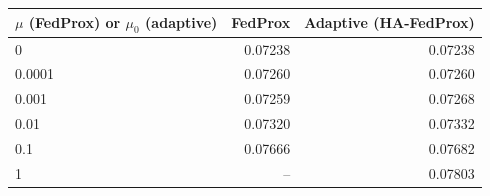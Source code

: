 \begin{tabular}{lrr}
\toprule
$\mu$ (FedProx) or $\mu_0$ (adaptive) & FedProx & Adaptive (HA-FedProx) \\
\midrule
0 & 0.07238 & 0.07238 \\
0.0001 & 0.07260 & 0.07260 \\
0.001 & 0.07259 & 0.07268 \\
0.01 & 0.07320 & 0.07332 \\
0.1 & 0.07666 & 0.07682 \\
1 & -- & 0.07803 \\
\bottomrule
\end{tabular}
